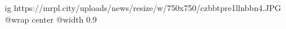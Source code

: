  
 
 
 
 

\ifcmt
  ig https://mrpl.city/uploads/news/resize/w/750x750/czbbtpre1llnbbn4.JPG
  @wrap center
  @width 0.9
\fi
